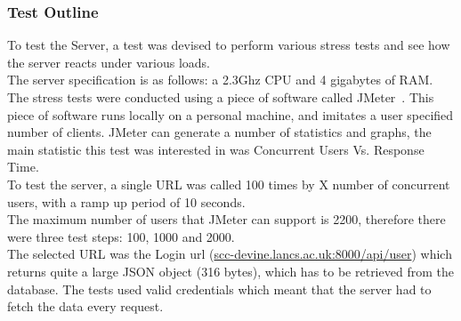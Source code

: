 \documentclass[preprint,12pt,3p]{elsarticle}
\begin{document}
\subsubsection{Test Outline}
To test the Server, a test was devised to perform various stress tests and see how the server reacts under various loads.\\
The server specification is as follows: a 2.3Ghz CPU and 4 gigabytes of RAM.\\
The stress tests were conducted using a piece of software called JMeter~\cite{jmeter}. This piece of software runs locally on a personal machine, and imitates a user specified number of clients. JMeter can generate a number of statistics and graphs, the main statistic this test was interested in was Concurrent Users Vs. Response Time.\\
To test the server, a single URL was called 100 times by X number of concurrent users, with a ramp up period of 10 seconds.\\
The maximum number of users that JMeter can support is 2200, therefore there were three test steps: 100, 1000 and 2000.\\
The selected URL was the Login url (\url{scc-devine.lancs.ac.uk:8000/api/user}) which returns quite a large JSON object (316 bytes), which has to be retrieved from the database. The tests used valid credentials which meant that the server had to fetch the data every request.
\end{document}
